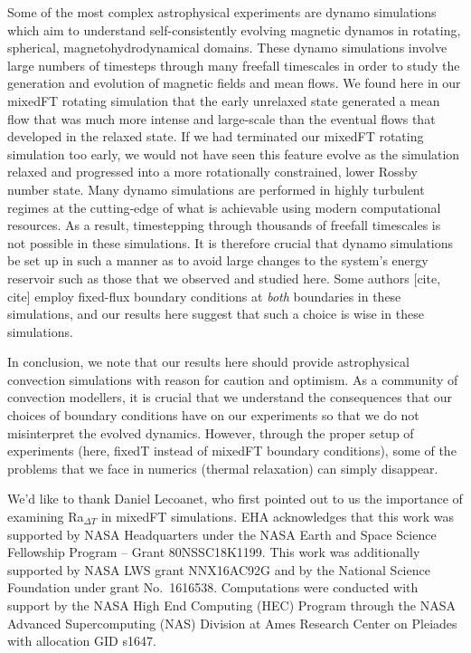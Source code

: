 \documentclass[aps, pre, onecolumn, nofootinbib, notitlepage, groupedaddress, amsfonts, amssymb, amsmath, longbibliography]{revtex4-1}
\begin{document}
Some of the most complex astrophysical experiments are dynamo simulations which aim to understand self-consistently evolving magnetic dynamos in rotating, spherical, magnetohydrodynamical domains.
These dynamo simulations involve large numbers of timesteps through many freefall timescales in order to study the generation and evolution of magnetic fields and mean flows.
We found here in our mixedFT rotating simulation that the early unrelaxed state generated a mean flow that was much more intense and large-scale than the eventual flows that developed in the relaxed state.
If we had terminated our mixedFT rotating simulation too early, we would not have seen this feature evolve as the simulation relaxed and progressed into a more rotationally constrained, lower Rossby number state.
Many dynamo simulations are performed in highly turbulent regimes at the cutting-edge of what is achievable using modern computational resources.
As a result, timestepping through thousands of freefall timescales is not possible in these simulations.
It is therefore crucial that dynamo simulations be set up in such a manner as to avoid large changes to the system's energy reservoir such as those that we observed and studied here.
Some authors [cite, cite] employ fixed-flux boundary conditions at \emph{both} boundaries in these simulations, and our results here suggest that such a choice is wise in these simulations.

In conclusion, we note that our results here should provide astrophysical convection simulations with reason for caution and optimism.
As a community of convection modellers, it is crucial that we understand the consequences that our choices of boundary conditions have on our experiments so that we do not misinterpret the evolved dynamics.
However, through the proper setup of experiments (here, fixedT instead of mixedFT boundary conditions), some of the problems that we face in numerics (thermal relaxation) can simply disappear.

\begin{acknowledgments}
We'd like to thank Daniel Lecoanet, who first pointed out to us the importance of examining Ra$_{\Delta T}$ in mixedFT simulations. 
EHA acknowledges that this work was supported by NASA Headquarters under the NASA Earth and Space Science Fellowship Program -- Grant 80NSSC18K1199.
This work was additionally supported by NASA LWS grant NNX16AC92G and by the National Science Foundation under grant No.~1616538. 
Computations were conducted with support by the NASA High End Computing (HEC) Program through the NASA  Advanced Supercomputing (NAS) Division at Ames Research Center on Pleiades with allocation GID s1647.
\end{acknowledgments}
\end{document}
